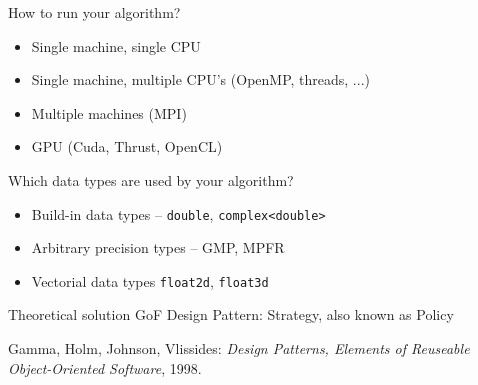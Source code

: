 \begin{frame}
  

  How to run your algorithm?
    \begin{itemize}
      \item Single machine, single CPU
      \item Single machine, multiple CPU's (OpenMP, threads, ...)
      \item Multiple machines (MPI)
      \item GPU (Cuda, Thrust, OpenCL)
    \end{itemize}

  \pause

  \vspace{2ex}

  Which data types are used by your algorithm?
   \begin{itemize}
    \item Build-in data types -- \texttt{double}, \texttt{complex<double>}
    \item Arbitrary precision types -- GMP, MPFR
    \item Vectorial data types \texttt{float2d}, \texttt{float3d}
   \end{itemize}

  \pause

  \vspace{2ex}

  \begin{block}{Theoretical solution}
    GoF Design Pattern: Strategy, also known as Policy
    
    {\tiny Gamma, Holm, Johnson, Vlissides: {\it Design Patterns, Elements of Reuseable Object-Oriented Software},  1998.}
  \end{block}
\end{frame}


